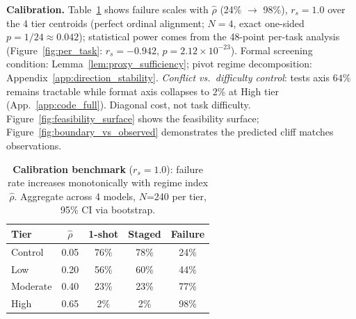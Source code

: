 \documentclass{article}
\theoremstyle{plain}
\theoremstyle{definition}
\theoremstyle{remark}
\newcommand{\rhohat}{\hat{\rho}}
\newcommand{\appref}[1]{App.~\ref{#1}}
\begin{document}
\textbf{Calibration.}
Table~\ref{tab:calibration} shows failure scales with $\rhohat$ (24\% $\to$ 98\%), $r_s = 1.0$ over the 4 tier centroids (perfect ordinal alignment; $N{=}4$, exact one-sided $p = 1/24 \approx 0.042$); statistical power comes from the 48-point per-task analysis (Figure~\ref{fig:per_task}: $r_s = -0.942$, $p = 2.12 \times 10^{-23}$). Formal screening condition: Lemma~\ref{lem:proxy_sufficiency}; pivot regime decomposition: Appendix~\ref{app:direction_stability}. \emph{Conflict vs.\ difficulty control}: tests axis $64\%$ remains tractable while format axis collapses to $2\%$ at High tier (\appref{app:code_full}). Diagonal cost, not task difficulty. Figure~\ref{fig:feasibility_surface} shows the feasibility surface; Figure~\ref{fig:boundary_vs_observed} demonstrates the predicted cliff matches observations.

\begin{table}[t]
\centering
\small
\caption{\textbf{Calibration benchmark} ($r_s = 1.0$): failure rate increases monotonically with regime index $\rhohat$. Aggregate across 4 models, $N$=240 per tier, 95\% CI via bootstrap.}
\label{tab:calibration}
\begin{tabular}{lcccc}
\toprule
Tier & $\rhohat$ & 1-shot & Staged & Failure \\
\midrule
Control & 0.05 & 76\% & 78\% & 24\% \\
Low & 0.20 & 56\% & 60\% & 44\% \\
Moderate & 0.40 & 23\% & 23\% & 77\% \\
High & 0.65 & 2\% & 2\% & 98\% \\
\bottomrule
\end{tabular}
\end{table}
\end{document}
